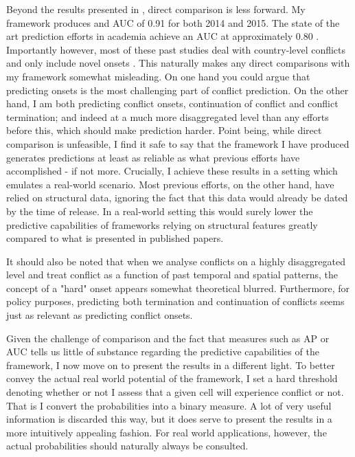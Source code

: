 \documentclass[a4paper]{article}
\begin{document}
Beyond the results presented in \cite{Maase}, direct comparison is less forward. My framework produces and AUC of 0.91 for both 2014 and 2015. The state of the art prediction efforts in academia achieve an AUC at approximately 0.80 \citep[14]{chadefaux2017conflict}. Importantly however, most of these past studies deal with country-level conflicts and only include novel onsets \citep[14]{chadefaux2017conflict}. This naturally makes any direct comparisons with my framework somewhat misleading. On one hand you could argue that predicting onsets is the most challenging part of conflict prediction. On the other hand, I am both predicting conflict onsets, continuation of conflict and conflict termination; and indeed at a much more disaggregated level than any efforts before this, which should make prediction harder. Point being, while direct comparison is unfeasible, I find it safe to say that the framework I have produced generates predictions at least as reliable as what previous efforts have accomplished - if not more. Crucially, I achieve these results in a setting which emulates a real-world scenario. Most previous efforts, on the other hand, have relied on structural data, ignoring the fact that this data would already be dated by the time of release. In a real-world setting this would surely lower the predictive capabilities of frameworks relying on structural features greatly compared to what is presented in published papers.\par
It should also be noted that when we analyse conflicts on a highly disaggregated level and treat conflict as a function of past temporal and spatial patterns, the concept of a "hard" onset appears somewhat theoretical blurred. Furthermore, for policy purposes, predicting both termination and continuation of conflicts seems just as relevant as predicting conflict onsets.\par  


Given the challenge of comparison and the fact that measures such as AP or AUC tells us little of substance regarding the predictive capabilities of the framework, I now move on to present the results in a different light. To better convey the actual real world potential of the framework, I set a hard threshold denoting whether or not I assess that a given cell will experience conflict or not. That is I convert the probabilities into a binary measure. A lot of very useful information is discarded this way, but it does serve to present the results in a more intuitively appealing fashion. For real world applications, however, the actual probabilities should naturally always be consulted.\par
\end{document}
